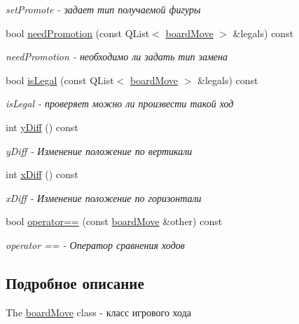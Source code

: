 \begin{DoxyCompactItemize}
\begin{DoxyCompactList}\small\item\em set\+Promote -\/ задает тип получаемой фигуры \end{DoxyCompactList}\item 
bool \hyperlink{classboard_move_ac4a4970efc03ec1a3c8c488c3a0e23de}{need\+Promotion} (const Q\+List$<$ \hyperlink{classboard_move}{board\+Move} $>$ \&legals) const 
\begin{DoxyCompactList}\small\item\em need\+Promotion -\/ необходимо ли задать тип замена \end{DoxyCompactList}\item 
bool \hyperlink{classboard_move_aab1e6f7a49fafc05e17af43ce9ab975d}{is\+Legal} (const Q\+List$<$ \hyperlink{classboard_move}{board\+Move} $>$ \&legals) const 
\begin{DoxyCompactList}\small\item\em is\+Legal -\/ проверяет можно ли произвести такой ход \end{DoxyCompactList}\item 
int \hyperlink{classboard_move_a8c8c96b47ef3afe63bca6d329003ec73}{y\+Diff} () const 
\begin{DoxyCompactList}\small\item\em y\+Diff -\/ Изменение положение по вертикали \end{DoxyCompactList}\item 
int \hyperlink{classboard_move_aef1b5f3e0bfc46deb712f411d18975e7}{x\+Diff} () const 
\begin{DoxyCompactList}\small\item\em x\+Diff -\/ Изменение положение по горизонтали \end{DoxyCompactList}\item 
bool \hyperlink{classboard_move_a23d6831f03a4a730061d5f278d2fdd57}{operator==} (const \hyperlink{classboard_move}{board\+Move} \&other) const 
\begin{DoxyCompactList}\small\item\em operator == -\/ Оператор сравнения ходов \end{DoxyCompactList}\end{DoxyCompactItemize}


\subsection{Подробное описание}
The \hyperlink{classboard_move}{board\+Move} class -\/ класс игрового хода 

